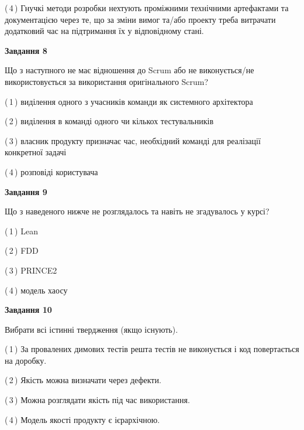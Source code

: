 \documentclass[10pt, ukrainian]{article}
\begin{document}
{\begin {large}
(\,4\,) Гнучкі методи розробки нехтують проміжними технічними артефактами та документацією через те, що за зміни вимог та/або проекту треба витрачати додатковий час на підтримання їх у відповідному стані. %


{\begin {center}\textbf{Завдання 8}\end {center}}\par
Що з наступного не має відношення до Scrum або не виконується/не використовується за використання оригінального Scrum?\par
\vspace{2mm}



(\,1\,) виділення одного з учасників команди як системного архітектора%



(\,2\,) виділення в команді одного чи кількох тестувальників%



(\,3\,) власник продукту призначає час, необхідний команді для реалізації конкретної задачі%



(\,4\,) розповіді користувача%


{\begin {center}\textbf{Завдання 9}\end {center}}\par
Що з наведеного нижче не розглядалось та навіть не згадувалось у курсі?\par
\vspace{2mm}



(\,1\,) Lean%



(\,2\,) FDD%



(\,3\,) PRINCE2%



(\,4\,) модель хаосу%


{\begin {center}\textbf{Завдання 10}\end {center}}\par
Вибрати всі істинні твердження (якщо існують).\par
\vspace{2mm}



(\,1\,) За провалених димових тестів решта тестів не виконується і код повертається на доробку.%



(\,2\,) Якість можна визначати через дефекти.%



(\,3\,) Можна розглядати якість під час використання.%



(\,4\,) Модель якості продукту є ієрархічною.%



\end {large}}
\end{document}
